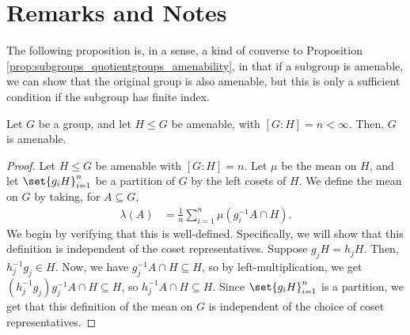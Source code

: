 \section{Remarks and Notes}\label{sec:invariant_states_remarks}%
The following proposition is, in a sense, a kind of converse to Proposition \ref{prop:subgroups_quotientgroups_amenability}, in that if a subgroup is amenable, we can show that the original group is also amenable, but this is only a sufficient condition if the subgroup has finite index.
\begin{proposition}\label{prop:finite_index_amenable_subgroup}
  Let $G$ be a group, and let $H\leq G$ be amenable, with $\left[G:H\right]  = n < \infty$. Then, $G$ is amenable.
\end{proposition}
\begin{proof}
  Let $H\leq G$ be amenable with $\left[G:H\right] = n$. Let $\mu$ be the mean on $H$, and let $\set{g_iH}_{i=1}^{n}$ be a partition of $G$ by the left cosets of $H$. We define the mean on $G$ by taking, for $A\subseteq G$,
  \begin{align*}
    \lambda\left(A\right) &= \frac{1}{n}\sum_{i=1}^{n}\mu\left(g_i^{-1}A\cap H\right).
  \end{align*}
  We begin by verifying that this is well-defined. Specifically, we will show that this definition is independent of the coset representatives. Suppose $g_jH = h_j H$. Then, $h_j^{-1}g_j \in H$. Now, we have $g_j^{-1}A \cap H \subseteq H$, so by left-multiplication, we get $\left(h_j^{-1}g_j\right)g_j^{-1}A\cap H \subseteq H$, so $h_j^{-1}A\cap H\subseteq H$. Since $\set{g_i H}_{i=1}^{n}$ is a partition, we get that this definition of the mean on $G$ is independent of the choice of coset representatives.\newline


\end{proof}
